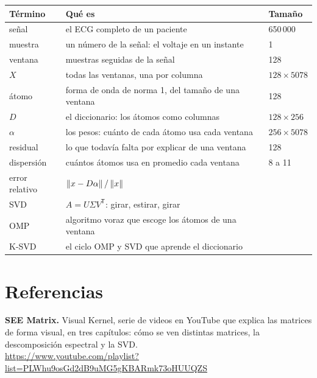 \documentclass[11pt,letterpaper]{article}
\newcommand{\T}{^{\mathsf{T}}}
\begin{document}
\begin{center}
\begin{tabular}{lp{8.6cm}l}
    \toprule
    \textbf{Término} & \textbf{Qué es} & \textbf{Tamaño} \\
    \midrule
    señal      & el ECG completo de un paciente           & 650\,000 \\
    muestra    & un número de la señal: el voltaje en un instante
               & 1 \\
    ventana    & muestras seguidas de la señal             & 128 \\
    $X$        & todas las ventanas, una por columna
               & $128 \times 5078$ \\
    átomo      & forma de onda de norma 1, del tamaño de una ventana
               & 128 \\
    $D$        & el diccionario: los átomos como columnas
               & $128 \times 256$ \\
    $\alpha$   & los pesos: cuánto de cada átomo usa cada ventana
               & $256 \times 5078$ \\
    residual   & lo que todavía falta por explicar de una ventana
               & 128 \\
    dispersión & cuántos átomos usa en promedio cada ventana & 8 a 11 \\
    error relativo & $\left\lVert x - D\alpha \right\rVert / \left\lVert x \right\rVert$        & \\
    SVD        & $A = U \Sigma V\T$: girar, estirar, girar  & \\
    OMP        & algoritmo voraz que escoge los átomos de una ventana
               & \\
    K-SVD      & el ciclo OMP y SVD que aprende el diccionario & \\
    \bottomrule
\end{tabular}
\end{center}

\section*{Referencias}

\begin{enumerate}[label={[\arabic*]}, itemsep=0.3em, leftmargin=*]
    \item \textbf{SEE Matrix.} Visual Kernel, serie de videos en
          YouTube que explica las matrices de forma visual, en tres
          capítulos: cómo se ven distintas matrices, la descomposición
          espectral y la SVD.\\
  \url{https://www.youtube.com/playlist?list=PLWhu9osGd2dB9uMG5gKBARmk73oHUUQZS}
\end{enumerate}
\end{document}
